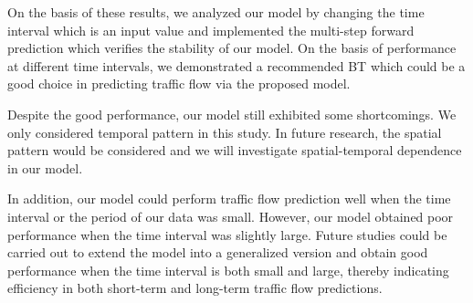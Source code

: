 \documentclass[twocolumn]{article}
\begin{document}
\par
On the basis of these results, we analyzed our model by changing the time interval which is an input value and implemented the multi-step forward prediction which verifies the stability of our model. On the basis of performance at different time intervals, we demonstrated a recommended BT which could be a good choice in predicting traffic flow via the proposed model.


\par
Despite the good performance, our model still exhibited some shortcomings. We only considered temporal pattern in this study. In future research, the spatial pattern would be considered and we will investigate spatial-temporal dependence in our model. 
\par
In addition, our model could perform traffic flow prediction well when the time interval or the period of our data was small. However, our model obtained poor performance when the time interval was slightly large. Future studies could be carried out to extend the model into a generalized version and obtain good performance when the time interval is both small and large, thereby indicating efficiency in both short-term and long-term traffic flow predictions.




\end{document}
